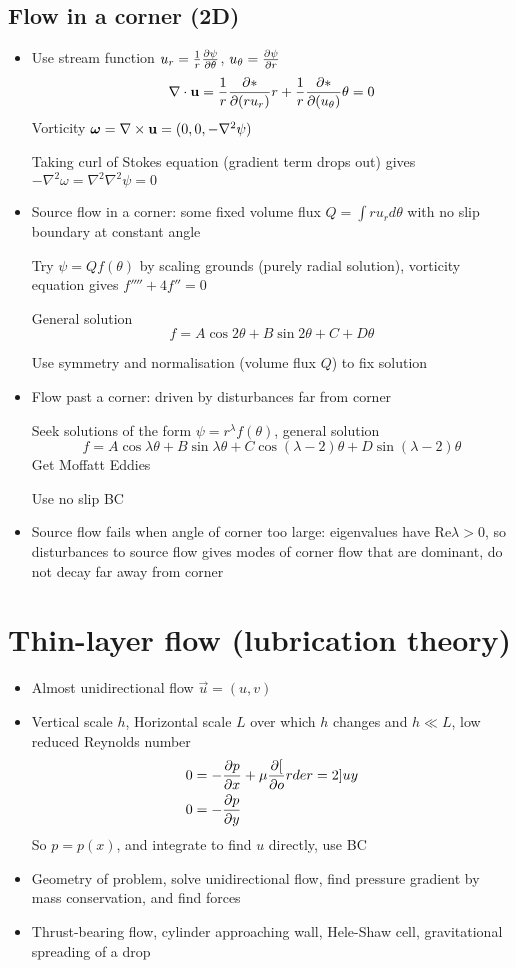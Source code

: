 \subsection*{Flow in a corner (2D)}
\begin{itemize}
    \item Use stream function
          $u_r = \frac{1}{r}\frac{\partial{\psi}}{\partial{\theta}}$, $u_\theta = \frac{\partial{\psi}}{\partial{r}}$
          \[\mathbf{\nabla} \cdot \boldsymbol{\mathbf{u}} = \frac{1}{r} \frac{\partial{*}}{\partial{(ru_r)}}{r} + \frac{1}{r}\frac{\partial{*}}{\partial{(u_\theta)}}{\theta} = 0\]
          Vorticity $\boldsymbol{\mathbf{\omega}} = \mathbf{\nabla} \times \boldsymbol{\mathbf{u}} = (0,0,-\nabla^2\psi)$

          Taking curl of Stokes equation (gradient term drops out) gives $-\nabla^2\omega = \nabla^2\nabla^2\psi = 0$

    \item Source flow in a corner: some fixed volume flux $Q = \int ru_r d\theta$ with no slip boundary at constant angle

          Try $\psi = Qf(\theta)$ by scaling grounds (purely radial solution), vorticity equation gives $f'''' +4f'' =0$

          General solution \[f = A\cos2\theta + B\sin 2\theta + C + D\theta\]

          Use symmetry and normalisation (volume flux $Q$) to fix solution

    \item Flow past a corner: driven by disturbances far from corner

          Seek solutions of the form $\psi = r^\lambda f(\theta)$, general solution \[f = A\cos\lambda\theta + B\sin \lambda\theta + C\cos(\lambda-2)\theta + D\sin (\lambda-2)\theta \]
          Get Moffatt Eddies

          Use no slip BC
    \item Source flow fails when angle of corner too large: eigenvalues have Re$\lambda > 0$, so disturbances to source flow gives modes of corner flow that are dominant, do not decay far away from corner

\end{itemize}

\section{Thin-layer flow (lubrication theory)}
\begin{itemize}
    \item Almost unidirectional flow $\vec{u} = (u,v)$
    \item Vertical scale $h$, Horizontal scale $L$ over which $h$ changes and $h \ll L$, low reduced Reynolds number
    \begin{align*}
        0 &= -\frac{\partial{p}}{\partial{x}} + \mu \frac{\partial{[}}{\partial{o}}rder=2]{u}{y} \\
        0 &= -\frac{\partial{p}}{\partial{y}}
    \end{align*}    
    So $p=p(x)$, and integrate to find $u$ directly, use BC
    \item Geometry of problem, solve unidirectional flow, find pressure gradient by mass conservation, and find forces
    \item Thrust-bearing flow, cylinder approaching wall, Hele-Shaw cell, gravitational spreading of a drop
\end{itemize}
